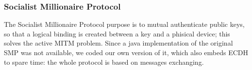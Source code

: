 \subsubsection{Socialist Millionaire Protocol}
The Socialist Millionaire Protocol purpose is to mutual authenticate public keys, so that a logical binding is created between a key and a phisical device; this solves the active MITM problem. Since a java implementation of the original SMP was not available, we coded our own version of it, which also embeds ECDH to spare time: the whole protocol is based on messages exchanging.